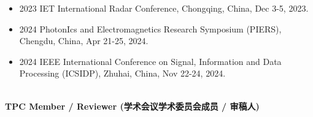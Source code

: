 \documentclass[paper=a4,fontsize=11pt]{scrartcl}
\begin{document}
\begin{itemize}
	\item 2023 IET International Radar Conference, Chongqing, China, Dec 3-5, 2023.
	\item 2024 PhotonIcs and Electromagnetics Research Symposium (PIERS), Chengdu, China, Apr 21-25, 2024.
	\item 2024 IEEE International Conference on Signal, Information and Data Processing (ICSIDP), Zhuhai, China, Nov 22-24, 2024.
\end{itemize}
~\\
\textbf{TPC Member / Reviewer (学术会议学术委员会成员 / 审稿人)} 
\end{document}
